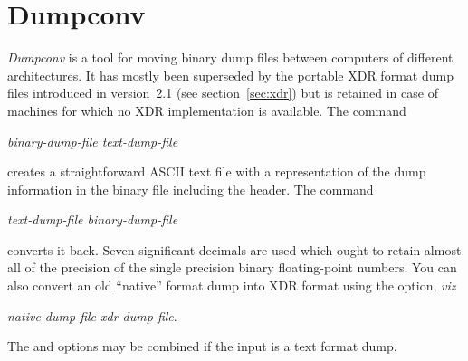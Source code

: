 \documentclass[a4paper,twoside]{report}
\begin{document}
\section{Dumpconv}%
\label{sec:dumpconv}
\emph{Dumpconv} is a tool for moving binary dump files between
computers of different architectures.  It has mostly been superseded
by the portable XDR format dump files introduced in version~2.1 (see
section~\ref{sec:xdr}) but is retained in case of machines for which
no XDR implementation is available.  The command
\begin{center}
 \textit{binary-dump-file text-dump-file} 
\end{center}
creates a straightforward ASCII text file with a representation of the
dump information in the binary file including the header.  The command
\begin{center}
 \textit{text-dump-file binary-dump-file} 
\end{center}
converts it back.  Seven significant decimals are used which ought to
retain almost all of the precision of the single precision binary
floating-point numbers.  You can also convert an old ``native'' format
dump into XDR format using the  option, \emph{viz}
\begin{center}
 \textit{native-dump-file xdr-dump-file}. 
\end{center}
The  and  options may be combined if the input is a
text format dump.
\end{document}
